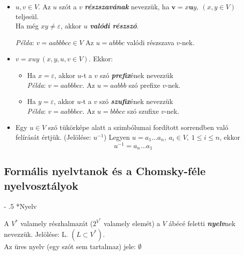 \documentclass[12pt,margin=0px]{article}
\makeatletter
\renewcommand\paragraph{%
	\@startsection{paragraph}{4}{0mm}%
	{-\baselineskip}%
	{.5\baselineskip}%
	{\normalfont\normalsize\bfseries}}
\makeatother
\begin{document}
	\begin{itemize}
		\item $u,v \in V$. Az $u$ szót a $v$ \textbf{\emph{részszavának}} nevezzük, ha $ \textbf{v} = x\textbf{u}y , \ (x,y \in V)$ teljesül.\\
        Ha még $xy\neq\varepsilon$, akkor $u$ \textbf{\emph{valódi részszó}}.

        \emph{Példa}: $v = aabbbcc \in V$ Az $u = abbbc$ valódi részszava $v$-nek.

		\item $ v  = xuy \ (x,y,u,v \in V)$. Ekkor:
		      \begin{itemize}
		      	\item Ha $x=\varepsilon$, akkor $u$-t a $v$ szó \textbf{\emph{prefix}}ének nevezzük\\
                \emph{Példa}: $v = aabbbcc$. Az $u = aabbb$ szó prefixe $v$-nek.
		      	\item Ha $y=\varepsilon$, akkor $u$-t a $v$ szó \textbf{\emph{szufix}}ének nevezzük\\
                \emph{Példa}: $v = aabbbcc$. Az $u = bbbcc$ szó szufixe $v$-nek.
		      \end{itemize}
		      						
		\item Egy $u\in V$ szó tükörképe alatt a szimbólumai fordított sorrendben való felírását értjük. (Jelölése: $u^{-1}$)
        \noindent Legyen $u = a_1 \ldots a_n,\ a_i \in V,\ 1 \leq i \leq n$, ekkor
        \[
            u^{-1} = a_n \ldots a_1
        \]
	\end{itemize}

    \noindent {\footnotesize $\triangleleft$ \faLightbulbO }
					
	\subsection*{Formális nyelvtanok és a Chomsky-féle nyelvosztályok}
					
	\paragraph*{Nyelv}
	
	\noindent A $V^{*}$ valamely részhalmazát ($2^{V^{*}}$ valamely elemét) a $V$ ábécé feletti \textbf{\emph{nyelv}}nek nevezzük. Jelölése: L. $(L \subset V^*)$.\\
							
	\noindent Az üres nyelv (egy szót sem tartalmaz) jele: $\emptyset$\\
\end{document}
